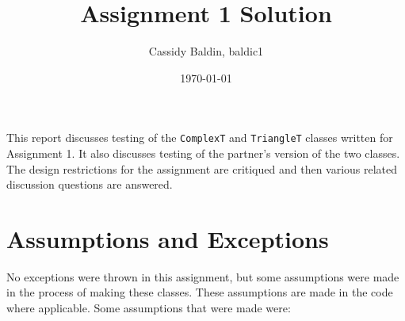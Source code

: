 \documentclass[12pt]{article}
\title{Assignment 1 Solution}
\author{Cassidy Baldin, baldic1}
\date{\today}
\begin{document}
\maketitle

This report discusses testing of the \verb|ComplexT| and \verb|TriangleT|
classes written for Assignment 1. It also discusses testing of the partner's
version of the two classes. The design restrictions for the assignment
are critiqued and then various related discussion questions are answered.

\section{Assumptions and Exceptions} \label{AssumptAndExcept}

No exceptions were thrown in this assignment, but some assumptions were made 
in the process of making these classes. These assumptions are made in the 
code where applicable. Some assumptions that were made were: 
\end{document}
